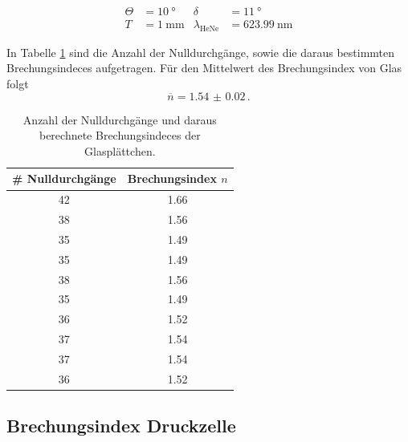 \begin{align*}
  \Theta &= \SI{10}{\degree} & \delta &= \SI{11}{\degree} \\
  T &= \SI{1}{\milli\meter}  & \lambda_\text{HeNe} &= \SI{623.99}{\nano\meter}
\end{align*}

In Tabelle \ref{tab:Glas} sind die Anzahl der Nulldurchgänge, sowie die daraus bestimmten Brechungsindeces aufgetragen. Für den Mittelwert des Brechungsindex von Glas folgt
\begin{equation}
  \overline{n} = \SI{1.54(2)} \, .
  \label{res:n_Glas}
\end{equation}

\begin{table}[H]
  \centering
  \caption{Anzahl der Nulldurchgänge und daraus berechnete Brechungsindeces der Glasplättchen.}
  \label{tab:Glas}
  \begin{tabular}{cc}
    \toprule
    \# Nulldurchgänge & Brechungsindex $n$ \\
    \midrule
    42 & \num{1.66} \\
    38 & \num{1.56} \\
    35 & \num{1.49} \\
    35 & \num{1.49} \\
    38 & \num{1.56} \\
    35 & \num{1.49} \\
    36 & \num{1.52} \\
    37 & \num{1.54} \\
    37 & \num{1.54} \\
    36 & \num{1.52} \\
    \bottomrule
  \end{tabular}
\end{table}

\subsection{Brechungsindex Druckzelle}

